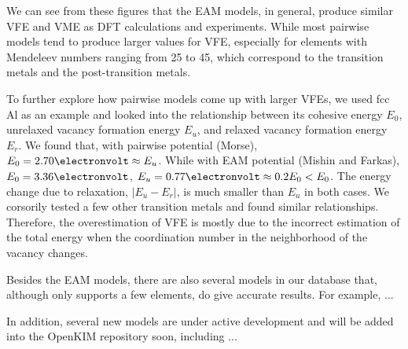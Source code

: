 \documentclass[%
 reprint,
 amsmath,amssymb,
 aps,
]{revtex4-1}
\begin{document}
We can see from these figures that the EAM models, in general, produce similar VFE and VME as DFT calculations and experiments.
While most pairwise models tend to produce larger values for VFE, especially for elements with Mendeleev numbers ranging from 25 to 45, which correspond to the transition metals and the post-transition metals.

To further explore how pairwise models come up with larger VFEs, we used fcc Al as an example and looked into the relationship between its cohesive energy $E_0$, unrelaxed vacancy formation energy $E_u$, and relaxed vacancy formation energy $E_r$.
We found that, with pairwise potential (Morse), $E_0 = 2.70\electronvolt \approx E_u$.
While with EAM potential (Mishin and Farkas), $E_0 = 3.36\electronvolt$, $E_u = 0.77\electronvolt \approx 0.2E_0 < E_0$.
The energy change due to relaxation, $|E_u-E_r|$, is much smaller than $E_u$ in both cases.
We corsorily tested a few other transition metals and found similar relationships.
Therefore, the overestimation of VFE is mostly due to the incorrect estimation of the total energy when the coordination number in the neighborhood of the vacancy changes.

Besides the EAM models, there are also several models in our database that, although only supports a few elements, do give accurate results.
For example, ...

In addition, several new models are under active development and will be added into the OpenKIM repository soon, including ...
\end{document}
